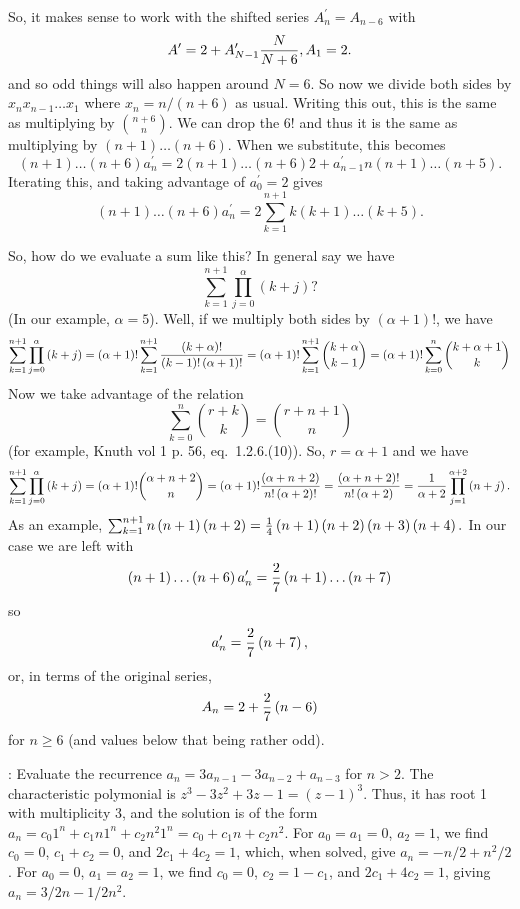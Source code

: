So, it makes sense to work with the shifted series $A^{\prime}_n = A_{n-6}$
with
$$
 A^{\prime} = 2 + A^{\prime}_{N-1} {N \over N + 6}, A_1 = 2 .
$$
and so odd things will also happen around $N = 6$.  
So now we divide both sides by $x_n x_{n-1} \ldots x_1$ where
$x_n = n / \left(n + 6\right)$ as usual.  Writing this out, this is 
the same as multiplying by $n + 6 \choose n$.  We can drop the $6!$
and thus it is the same as multiplying by $\left(n + 1\right)\ldots\left(n+6\right)$.
When we substitute, this becomes
$$
 \left(n+1\right)\ldots\left(n+6\right) a^{\prime}_n = 2 \left(n+1\right)\ldots
 \left(n+6\right) 2 + a^{\prime}_{n-1} n \left(n+1\right)\ldots\left(n+5\right).
$$
Iterating this, and taking advantage of $a^{\prime}_0 = 2$ gives
$$
\left(n+1\right)\ldots\left(n+6\right) a^{\prime}_n = 2 \sum_{k=1}^{n+1}
k \left(k + 1\right)\ldots\left(k+5\right).
$$

So, how do we evaluate a sum like this?  In general say we have
$$
 \sum_{k=1}^{n+1} \prod_{j=0}^{\alpha} \left(k + j\right)?
$$
(In our example, $\alpha = 5$).  Well, if we multiply both sides by 
$\left(\alpha + 1\right) !$, we have
$$
 \sum_{k=1}^{n+1} \prod_{j=0}^{\alpha} \left(k + j\right) =
 \left(\alpha + 1\right)! \sum_{k=1}^{n+1} {\left(k + \alpha\right)!
   \over \left(k - 1\right)! \left(\alpha + 1\right)!} =
    \left(\alpha + 1\right)! \sum_{k=1}^{n+1} {k + \alpha \choose k - 1}
     = \left(\alpha + 1\right)! \sum_{k=0}^{n} {k + \alpha + 1 \choose k}
$$
Now we take advantage of the relation
$$
 \sum_{k=0}^n {r + k \choose k} = {r + n + 1 \choose n}
$$
(for example, Knuth vol 1 p. 56, eq.~1.2.6.(10)).  So, $r=\alpha + 1$
and we have
$$
  \sum_{k=1}^{n+1} \prod_{j=0}^{\alpha} \left(k + j\right) =
  \left(\alpha + 1\right)! {\alpha + n + 2 \choose n} =
  \left(\alpha + 1\right)! {\left(\alpha + n + 2\right) \over n! \left(\alpha + 2\right)!} =
  { \left(\alpha + n + 2\right)! \over n! \left(\alpha + 2\right)}
  = {1 \over \alpha + 2} \prod_{j=1}^{\alpha + 2} \left(n + j\right).
$$
As an example, $\sum_{k=1}^{n+1} n \left(n + 1\right) \left(n + 2\right)
 = {1 \over 4} \left(n + 1\right)\left(n + 2\right) \left(n + 3\right) \left(n + 4\right).$
 In our case we are left with
$$
\left(n+1\right)\ldots\left(n+6\right) a^{\prime}_n = {2 \over 7}
\left(n + 1\right) \ldots \left(n + 7\right)
$$
so
$$ 
 a^{\prime}_n = {2 \over 7} \left(n + 7\right),
$$
or, in terms of the original series,
$$
 A_n  = 2 + {2 \over 7} \left(n - 6\right)
$$
for $n \ge 6$ (and values below that being rather odd).

\vskip 0.08in : Evaluate the
recurrence $a_n = 3 a_{n-1} - 3 a_{n-2} + a_{n-3}$ for $n > 2$.\hfil\break
The characteristic polymonial is $z^3 - 3 z^2 + 3 z - 1 = \left(z - 1\right)^3$.
Thus, it has root 1 with multiplicity 3, and the solution is of the form
$a_n = c_0 1^n + c_1 n 1^n + c_2 n^2 1^n = c_0 + c_1 n + c_2 n^2$.
For $a_0 = a_1 = 0$, $a_2 = 1$, we find $c_0 = 0$, $c_1 + c_2 = 0$,
and $2 c_1 + 4 c_2 = 1$, which, when solved, give $a_n = -n / 2 + n^2/2$.
For $a_0 = 0$, $a_1 = a_2 = 1$, we find $c_0 = 0$, $c_2 = 1 - c_1$,
and $2 c_1 + 4 c_2 = 1$, giving $a_n = 3/2 n - 1/2 n^2$.

